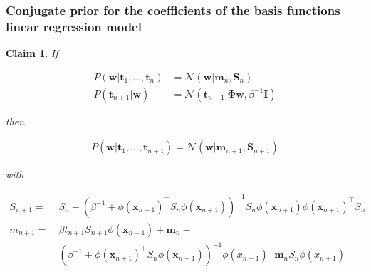 \documentclass[11pt]{beamer}
\newtheorem{claim}{Claim}
\begin{document}
\begin{frame}
    \frametitle{Conjugate prior for the coefficients of the basis functions
    linear regression model}

    \scriptsize
    \begin{claim}
        If 

        \begin{align}
            P(\mathbf{w}|\mathbf{t}_1,\ldots,\mathbf{t}_n)&=\mathcal{N}(\mathbf{w}|\mathbf{m}_n,\mathbf{S}_n)\label{eq:conjPriorPrior}\\
            P(\mathbf{t}_{n+1}|\mathbf{w})&=\mathcal{N}(\mathbf{t}_{n+1}|\boldsymbol{\Phi}\mathbf{w},\beta^{-1}\mathbf{I})\label{eq:conjPriorLike}
        \end{align}

        then

        \begin{align*}
            P(\mathbf{w}|\mathbf{t}_1,\ldots,\mathbf{t}_{n+1})=\mathcal{N}(\mathbf{w}|\mathbf{m}_{n+1},\mathbf{S}_{n+1})
        \end{align*}

        with

        \begin{align}
            S_{n+1}=\ &S_n-(\beta^{-1}+\phi(\mathbf{x}_{n+1})^\intercal S_n\phi(\mathbf{x}_{n+1}))^{-1}S_n\phi(\mathbf{x}_{n+1})\phi(\mathbf{x}_{n+1})^\intercal
            S_n\label{eq:Sn+1}\\
            m_{n+1}=\ &\beta t_{n+1}S_{n+1}\phi(\mathbf{x}_{n+1})+\mathbf{m}_n-\nonumber\\
                      &(\beta^{-1}+\phi(\mathbf{x}_{n+1})^\intercal
                      S_n\phi(\mathbf{x}_{n+1}))^{-1}\phi(x_{n+1})^\intercal\mathbf{m}_nS_n\phi(x_{n+1})\label{eq:mn+1}
        \end{align}
        \label{claim:conjPriorForBayesianLinearRegression}
    \end{claim}
    \normalsize
\end{frame}
\end{document}
